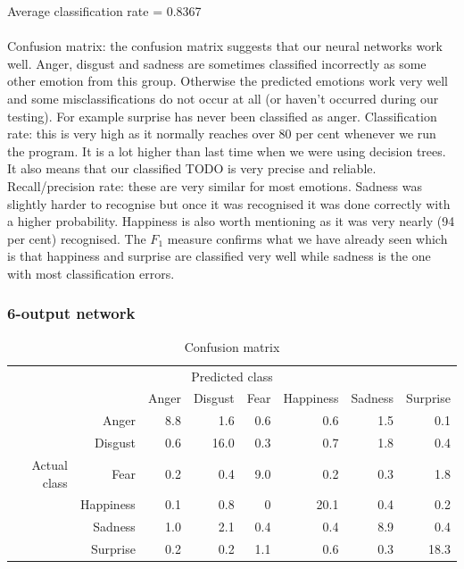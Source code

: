 \documentclass[12pt]{article}
\begin{document}
Average classification rate = 0.8367 \\ \\

Confusion matrix: the confusion matrix suggests that our neural networks work well. Anger, disgust and sadness are sometimes classified incorrectly as some other emotion from this group. Otherwise the predicted emotions work very well and some misclassifications do not occur at all (or haven't occurred during our testing). For example surprise has never been classified as anger. Classification rate: this is very high as it normally reaches over 80 per cent whenever we run the program. It is a lot higher than last time when we were using decision trees. It also means that our classified TODO is very precise and reliable. Recall/precision rate: these are very similar for most emotions. Sadness was slightly harder to recognise but once it was recognised it was done correctly with a higher probability. Happiness is also worth mentioning as it was very nearly (94 per cent) recognised. The $F_1$ measure confirms what we have already seen which is that happiness and surprise are classified very well while sadness is the one with most classification errors.


\subsubsection*{6-output network}

\begin{table}
\centering
\begin{tabular}{r r | r r r r r r}
\multicolumn{8}{c}{Predicted class} \\
&  & Anger & Disgust & Fear & Happiness & Sadness & Surprise \\
\hline
 & Anger            & 8.8 & 1.6  & 0.6 & 0.6  & 1.5 & 0.1  \\
 & Disgust          & 0.6 & 16.0 & 0.3 & 0.7  & 1.8 & 0.4  \\
Actual class & Fear & 0.2 & 0.4  & 9.0 & 0.2  & 0.3 & 1.8  \\
 & Happiness        & 0.1 & 0.8  & 0   & 20.1 & 0.4 & 0.2  \\
 & Sadness          & 1.0 & 2.1  & 0.4 & 0.4  & 8.9 & 0.4  \\
 & Surprise         & 0.2 & 0.2  & 1.1 & 0.6  & 0.3 & 18.3 \\
\end{tabular}
\caption{Confusion matrix}
\end{table}
\end{document}
